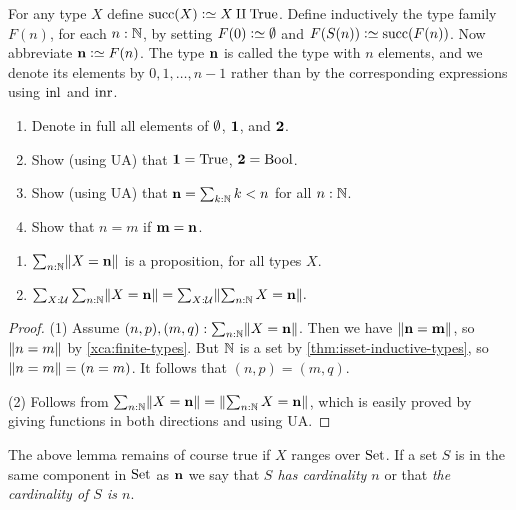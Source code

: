 \begin{definition}\label{def:finiteset}
For any type $X$ define $\Succ(X)\defeq X\amalg\true$.
Define inductively the type family $F(n)$, for each $n:\mathbb{N}$, by
setting $F(0)\defeq\emptytype$ and $F(S(n))\defeq\Succ(F(n))$.
Now abbreviate $\bn{n}\defeq F(n)$. The type $\mathbf{n}$ is called
the type with $n$ elements, and we denote its elements
by $0,1,\ldots,n-1$ rather than by the corresponding expressions
using $\inl{}$ and $\inr{}$.

\begin{xca}\label{xca:finite-types}
\hspace{1in}
  \begin{enumerate}
  \item Denote in full all elements of $\emptyset$, $\mathbf{1} $, and $\mathbf{2}$.
  \item Show (using UA) that $\mathbf{1} =\mathrm{True}$, $\mathbf{2} =\mathrm{Bool}$.
  \item Show (using UA) that $\mathbf{n} = \sum_{k:\mathbb{N}} k<n$ for all $n:\mathbb{N}$.
  \item Show that $n=m$ if $\mathbf{m}=\mathbf{n}$.
  \end{enumerate}
\end{xca}
  
\begin{lemma}\label{lem:maxonefinitetype}
\hspace{1in}%
\begin{enumerate}
  \item $\sum_{n:\mathbb{N}}\lVert X=\mathbf{n}\rVert$ is a proposition, for all types $X$.
  \item 
$\sum_{X:{\mathcal{U}}}\sum_{n:\mathbb{N}}\lVert X=\mathbf{n}\rVert =\sum_{X:{\mathcal{U}}}\lVert\sum_{n:\mathbb{N}}X=\mathbf{n}\rVert.$
  \end{enumerate}
\end{lemma}
\begin{proof}

(1) Assume $(n,p),(m,q): \sum_{n:\mathbb{N}}\lVert X=\mathbf{n}\rVert$.
Then we have $\lVert\mathbf{n}=\mathbf{m}\rVert$, so $\lVert n=m\rVert$
by \cref{xca:finite-types}. But $\mathbb{N}$ is a set by \cref{thm:isset-inductive-types}, 
so $\lVert n=m\rVert=(n=m)$. It follows that $(n,p)=(m,q)$.

(2) Follows from $\sum_{n:\mathbb{N}}\lVert X=\mathbf{n}\rVert =\lVert\sum_{n:\mathbb{N}}X=\mathbf{n}\rVert$,
which is easily proved by giving functions in both directions and using UA.
\end{proof}

The above lemma remains of course true if $X$ ranges over $\mathrm{Set}$.
If a set $S$ is in the same component in $\mathrm{Set}$ as $\mathbf{n}$ we say that \emph{$S$ has cardinality $n$} or that \emph{the cardinality of $S$ is $n$}.


\end{definition}
